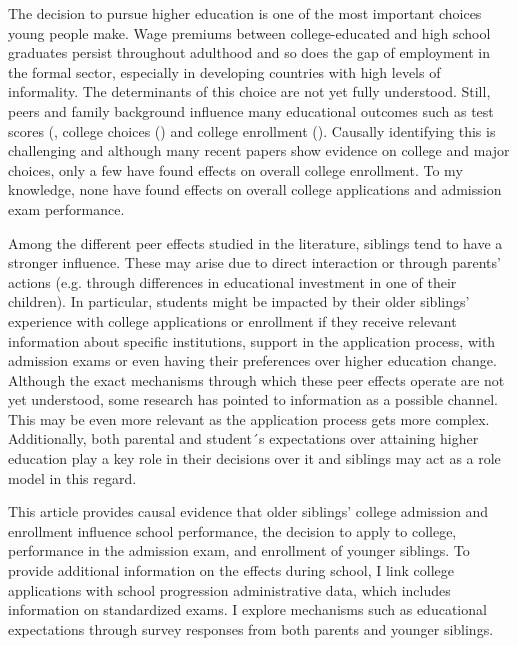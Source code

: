 






The decision to pursue higher education is one of the most important choices young people make. Wage premiums between college-educated and high school graduates persist throughout adulthood and so does the gap of employment in the formal sector, especially in developing countries with high levels of informality. The determinants of this choice are not yet fully understood. Still, peers and family background influence many educational outcomes such as test scores (\cite{qureshi_siblings_2018}, college choices (\cite{altmejd_o_2021}) and college enrollment (\cite{barrios-fernandez_neighbors_2022}). Causally identifying this is challenging and although many recent papers show evidence on college and major choices, only a few have found effects on overall college enrollment. To my knowledge, none have found effects on overall college applications and admission exam performance.

Among the different peer effects studied in the literature, siblings tend to have a stronger influence. These may arise due to direct interaction or through parents' actions (e.g. through differences in educational investment in one of their children). In particular, students might be impacted by their older siblings' experience with college applications or enrollment if they receive relevant information about specific institutions, support in the application process, with admission exams or even having their preferences over higher education change. Although the exact mechanisms through which these peer effects operate are not yet understood, some research has pointed to information as a possible channel. This may be even more relevant as the application process gets more complex. Additionally, both parental and student´s expectations over attaining higher education play a key role in their decisions over it and siblings may act as a role model in this regard.

This article provides causal evidence that older siblings' college admission and enrollment influence school performance, the decision to apply to college, performance in the admission exam, and enrollment of younger siblings. To provide additional information on the effects during school, I link college applications with school progression administrative data, which includes information on standardized exams. I explore mechanisms such as educational expectations through survey responses from both parents and younger siblings.

